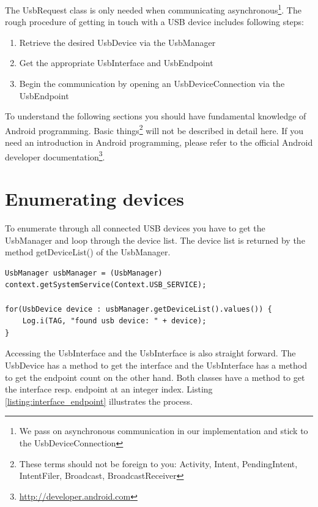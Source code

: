 The UsbRequest class is only needed when communicating asynchronous\footnote{We pass on asynchronous communication in our implementation and stick to the UsbDeviceConnection}. The rough procedure of getting in touch with a USB device includes following steps:

\begin{enumerate}
\item Retrieve the desired UsbDevice via the UsbManager
\item Get the appropriate UsbInterface and UsbEndpoint
\item Begin the communication by opening an UsbDeviceConnection via the UsbEndpoint
\end{enumerate}

To understand the following sections you should have fundamental knowledge of Android programming. Basic things\footnote{These terms should not be foreign to you: Activity, Intent, PendingIntent, IntentFiler, Broadcast, BroadcastReceiver} will not be described in detail here. If you need an introduction in Android programming, please refer to the official Android developer documentation\footnote{\url{http://developer.android.com}}.

\section{Enumerating devices}

To enumerate through all connected USB devices you have to get the UsbManager and loop through the device list. The device list is returned by the method getDeviceList() of the UsbManager.

\begin{lstlisting}[caption=Enumerating connected USB devices, label=listing:enumerate]
UsbManager usbManager = (UsbManager) context.getSystemService(Context.USB_SERVICE);
		
for(UsbDevice device : usbManager.getDeviceList().values()) {
	Log.i(TAG, "found usb device: " + device);
}
\end{lstlisting}

Accessing the UsbInterface and the UsbInterface is also straight forward. The UsbDevice has a method to get the interface and the UsbInterface has a method to get the endpoint count on the other hand. Both classes have a method to get the interface resp. endpoint at an integer index. Listing \ref{listing:interface_endpoint} illustrates the process.

